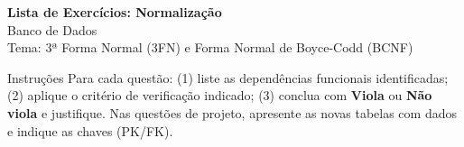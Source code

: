 \documentclass[12pt]{article}
\begin{document}
\vspace*{0.2cm}
\begin{center}
  {\Large \textbf{Lista de Exercícios: Normalização}}\\[0.2cm]
  {\large Banco de Dados}\\[0.2cm]
  Tema: 3ª Forma Normal (3FN) e Forma Normal de Boyce-Codd (BCNF)
\end{center}

\vspace{0.3cm}

\begin{block}{Instruções}
Para cada questão: (1) liste as dependências funcionais identificadas; (2) aplique o critério de verificação indicado; (3) conclua com \textbf{Viola} ou \textbf{Não viola} e justifique. Nas questões de projeto, apresente as novas tabelas com dados e indique as chaves (PK/FK).
\end{block}

\vspace{0.4cm}
\end{document}
